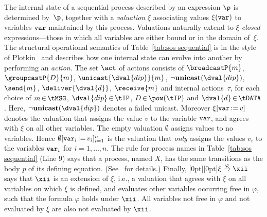 \documentclass[envcountsame,envcountsect,orivec,runningheads]{llncs}
\newcommand{\plat}[1]{\raisebox{0pt}[0pt][0pt]{#1}} \newcommand{\spaces}[1]{\ #1\ }
\renewcommand{\keyw}[1]{\ensuremath{{\tt #1}}}
\begin{document}
The internal state of a sequential process described by an expression
$\p$ is determined by~$\p$, together with a \emph{valuation} $\xi$
associating values $\xi(\keyw{var})$ to variables \keyw{var}
maintained by this process. Valuations naturally extend to
\emph{$\xi$-closed} expressions---those in which all variables are
either bound or in the domain of~$\xi$. The structural operational
semantics of Table~\ref{tab:sos sequential} is in the style of
Plotkin~\cite{Pl04} and describes how one internal state can evolve
into another by performing an \emph{action}.
The set $\act$ of actions consists of
$\broadcastP{m}$,
$\groupcastP{D}{m}$,
$\unicast{\dval{dip}}{m}$,
$\neg\textbf{unicast}(\dval{dip})$,
$\send{m}$,
$\deliver{\dval{d}}$,
$\receive{m}$
and internal actions~$\tau$, for each choice of $m \mathop{\in}\tMSG$,
$\dval{dip}\mathop{\in}\tIP$, $D\mathop{\in}\pow(\tIP)$ and
$\dval{d}\mathop{\in}\tDATA$.  Here, $\neg\textbf{unicast}(\dval{dip})$
denotes a failed unicast. Moreover $\xi[\keyw{var}\mathop{:=}v]$
denotes the valuation that assigns the value $v$ to the variable
\keyw{var}, and agrees with $\xi$ on all other variables. The empty
valuation $\emptyset$ assigns values to no variables. Hence
$\emptyset[\keyw{var}_i\mathop{:=}v_i]_{i=1}^n$ is the valuation that
\emph{only} assigns the values $v_i$ to the variables $\keyw{var}_i$
for $i=1,\ldots,n$. The rule for process names in Table~\ref{tab:sos
  sequential} (Line $9$) says that a process, named $X$, has the same
transitions as the body $p$ of its defining equation. (See~\cite{TR11}
for details.)  Finally, \plat{$\xi
  \stackrel{\varphi}{\rightarrow}\xii$} says that $\xii$ is an
extension of $\xi$, i.e., a valuation that agrees with $\xi$ on all
variables on which $\xi$ is defined, and evaluates other variables
occurring free in $\varphi$, such that the formula $\varphi$ holds
under $\xii$. All variables not free in $\varphi$ and not evaluated by $\xi$ 
are also not evaluated by $\xii$.
\end{document}
